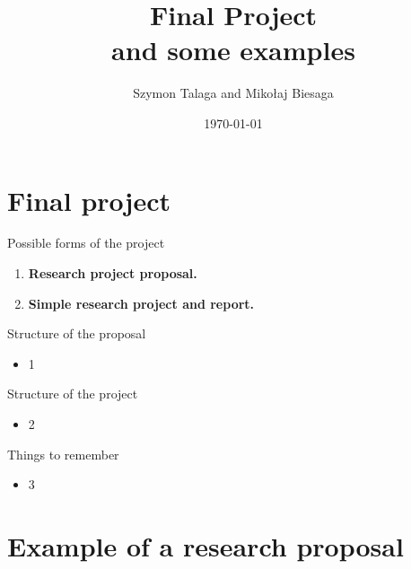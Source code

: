 \title[Final Project]{
    Final Project \\
    \small{and some examples}
}
\author[]{Szymon Talaga and Mikołaj Biesaga} %
\date{\today} %

\frame{\titlepage}

\section{Final project}

\begin{frame}{Possible forms of the project}
\begin{enumerate}
    \item \textbf{Research project proposal.}
    \item \textbf{Simple research project and report.}
\end{enumerate}
\end{frame}

\begin{frame}{Structure of the proposal}
\begin{itemize}
    \item 1
\end{itemize}
\end{frame}

\begin{frame}{Structure of the project}
\begin{itemize}
    \item 2
\end{itemize}
\end{frame}

\begin{frame}{Things to remember}
\begin{itemize}
    \item 3
\end{itemize}
\end{frame}

\section[Example]{Example of a research proposal}

